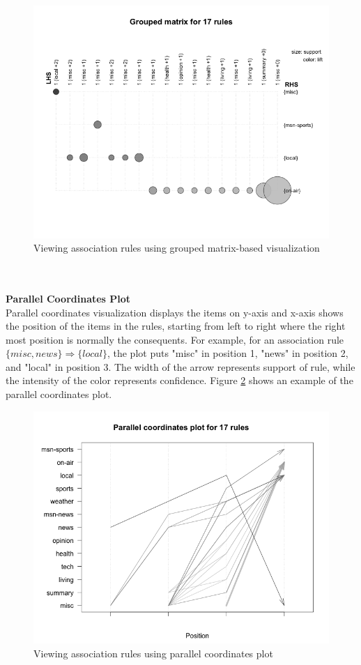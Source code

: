 \documentclass{article}
\begin{document}
\begin{figure}[h!]
  \centering
    \includegraphics[width=1.0\textwidth]{images/grouped}
    \caption{Viewing association rules using grouped matrix-based visualization}
    \label{fig:grouped}
\end{figure}
\\\\
\textbf{Parallel Coordinates Plot}\\
Parallel coordinates visualization displays the items on y-axis and x-axis shows the position of the items in the rules, starting from left to right where the right most position is normally the consequents.  For example, for an association rule $\{misc, news\} \Rightarrow \{local\}$, the plot puts "misc" in position 1, "news" in position 2, and "local" in position 3.  The width of the arrow represents support of rule, while the intensity of the color represents confidence.  Figure \ref{fig:paracoord} shows an example of the parallel coordinates plot.   
\begin{figure}[h!]
  \centering
    \includegraphics[width=1.0\textwidth]{images/paracoord}
    \caption{Viewing association rules using parallel coordinates plot}
    \label{fig:paracoord}
\end{figure}
\end{document}
